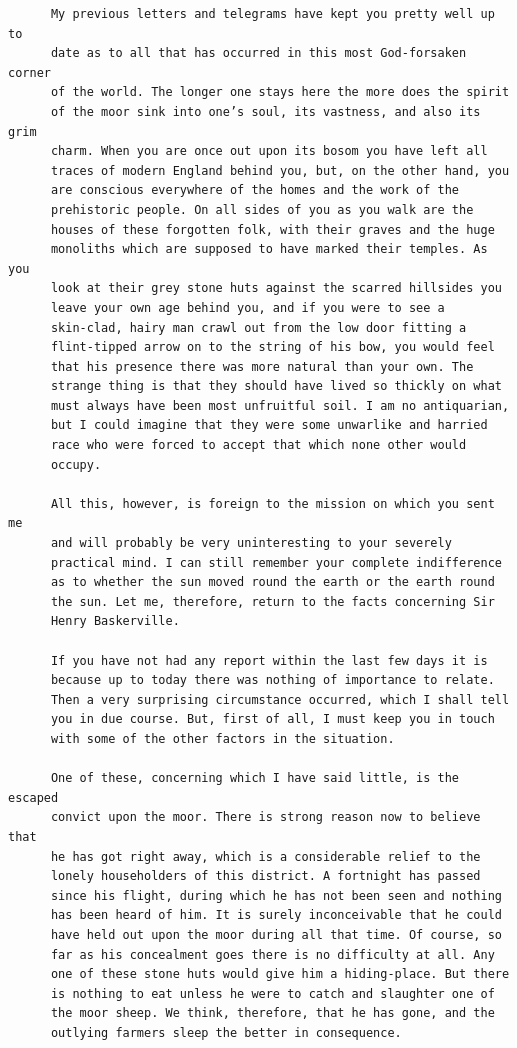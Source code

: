 \documentclass{article}
\begin{document}
\begin{verbatim}
      My previous letters and telegrams have kept you pretty well up to
      date as to all that has occurred in this most God-forsaken corner
      of the world. The longer one stays here the more does the spirit
      of the moor sink into one’s soul, its vastness, and also its grim
      charm. When you are once out upon its bosom you have left all
      traces of modern England behind you, but, on the other hand, you
      are conscious everywhere of the homes and the work of the
      prehistoric people. On all sides of you as you walk are the
      houses of these forgotten folk, with their graves and the huge
      monoliths which are supposed to have marked their temples. As you
      look at their grey stone huts against the scarred hillsides you
      leave your own age behind you, and if you were to see a
      skin-clad, hairy man crawl out from the low door fitting a
      flint-tipped arrow on to the string of his bow, you would feel
      that his presence there was more natural than your own. The
      strange thing is that they should have lived so thickly on what
      must always have been most unfruitful soil. I am no antiquarian,
      but I could imagine that they were some unwarlike and harried
      race who were forced to accept that which none other would
      occupy.

      All this, however, is foreign to the mission on which you sent me
      and will probably be very uninteresting to your severely
      practical mind. I can still remember your complete indifference
      as to whether the sun moved round the earth or the earth round
      the sun. Let me, therefore, return to the facts concerning Sir
      Henry Baskerville.

      If you have not had any report within the last few days it is
      because up to today there was nothing of importance to relate.
      Then a very surprising circumstance occurred, which I shall tell
      you in due course. But, first of all, I must keep you in touch
      with some of the other factors in the situation.

      One of these, concerning which I have said little, is the escaped
      convict upon the moor. There is strong reason now to believe that
      he has got right away, which is a considerable relief to the
      lonely householders of this district. A fortnight has passed
      since his flight, during which he has not been seen and nothing
      has been heard of him. It is surely inconceivable that he could
      have held out upon the moor during all that time. Of course, so
      far as his concealment goes there is no difficulty at all. Any
      one of these stone huts would give him a hiding-place. But there
      is nothing to eat unless he were to catch and slaughter one of
      the moor sheep. We think, therefore, that he has gone, and the
      outlying farmers sleep the better in consequence.


\end{verbatim}
\end{document}
